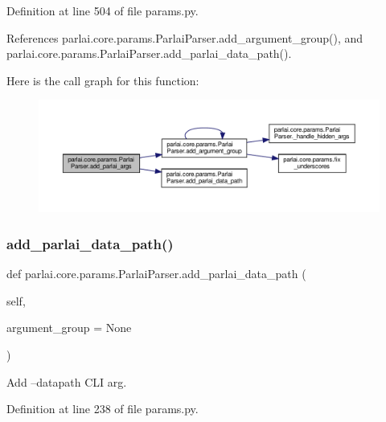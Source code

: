 Definition at line 504 of file params.\+py.



References parlai.\+core.\+params.\+Parlai\+Parser.\+add\+\_\+argument\+\_\+group(), and parlai.\+core.\+params.\+Parlai\+Parser.\+add\+\_\+parlai\+\_\+data\+\_\+path().

Here is the call graph for this function\+:
\nopagebreak
\begin{figure}[H]
\begin{center}
\leavevmode
\includegraphics[width=350pt]{classparlai_1_1core_1_1params_1_1ParlaiParser_a3dfaa7781346d8c974d60684e81cb705_cgraph}
\end{center}
\end{figure}
\mbox{\label{classparlai_1_1core_1_1params_1_1ParlaiParser_a896033a34a5e5e1bbc081d99e9835d6b}} 
\subsubsection{\texorpdfstring{add\+\_\+parlai\+\_\+data\+\_\+path()}{add\_parlai\_data\_path()}}
{\footnotesize\ttfamily def parlai.\+core.\+params.\+Parlai\+Parser.\+add\+\_\+parlai\+\_\+data\+\_\+path (\begin{DoxyParamCaption}\item[{}]{self,  }\item[{}]{argument\+\_\+group = {\ttfamily None} }\end{DoxyParamCaption})}

\begin{DoxyVerb}Add --datapath CLI arg.\end{DoxyVerb}
 

Definition at line 238 of file params.\+py.



